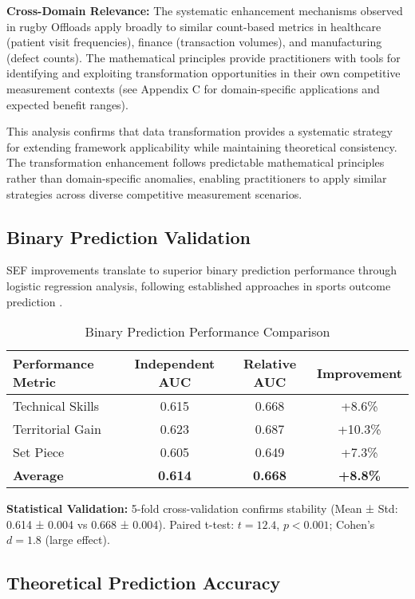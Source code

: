 \textbf{Cross-Domain Relevance:} The systematic enhancement mechanisms observed in rugby Offloads apply broadly to similar count-based metrics in healthcare (patient visit frequencies), finance (transaction volumes), and manufacturing (defect counts). The mathematical principles provide practitioners with tools for identifying and exploiting transformation opportunities in their own competitive measurement contexts (see Appendix C for domain-specific applications and expected benefit ranges).

This analysis confirms that data transformation provides a systematic strategy for extending framework applicability while maintaining theoretical consistency. The transformation enhancement follows predictable mathematical principles rather than domain-specific anomalies, enabling practitioners to apply similar strategies across diverse competitive measurement scenarios.

\subsection{Binary Prediction Validation}

SEF improvements translate to superior binary prediction performance through logistic regression analysis, following established approaches in sports outcome prediction \cite{dixon1997modelling, berrar2019incorporating}.

\begin{table}[h]
\centering
\caption{Binary Prediction Performance Comparison}
\begin{tabular}{lccc}
\hline
\textbf{Performance Metric} & \textbf{Independent AUC} & \textbf{Relative AUC} & \textbf{Improvement} \\
\hline
Technical Skills & 0.615 & 0.668 & +8.6\% \\
Territorial Gain & 0.623 & 0.687 & +10.3\% \\
Set Piece & 0.605 & 0.649 & +7.3\% \\
\hline
\textbf{Average} & \textbf{0.614} & \textbf{0.668} & \textbf{+8.8\%} \\
\hline
\end{tabular}
\end{table}

\textbf{Statistical Validation:} 5-fold cross-validation confirms stability (Mean ± Std: 0.614 ± 0.004 vs 0.668 ± 0.004). Paired t-test: $t = 12.4$, $p < 0.001$; Cohen's $d = 1.8$ (large effect).

\subsection{Theoretical Prediction Accuracy}

